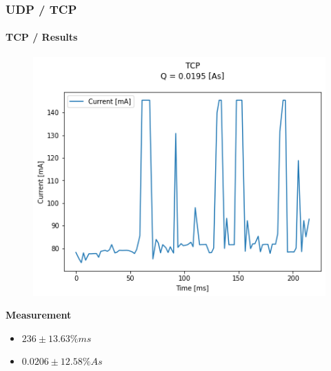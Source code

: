 \begin{frame}
	\frametitle{UDP / TCP}
	\framesubtitle{TCP / Results}
	\begin{minipage}[c]{0.50 \textwidth}
		\begin{figure}[H]
			\centering
			\includegraphics[width = 0.9 \linewidth]{fig/UDP_TCP/tcp_s_o.png}
		\end{figure}
	\end{minipage}
	\begin{minipage}[r]{0.40 \textwidth}
		\vspace{-80pt}
		\textbf{Measurement}\linebreak
		\begin{itemize}
			\item $236\pm13.63\%ms$
			\item $0.0206 \pm 12.58\%As$
		\end{itemize}
	\end{minipage}
\end{frame}
